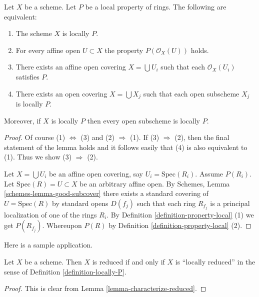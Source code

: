 \begin{lemma}
\label{lemma-locally-P}
Let $X$ be a scheme. Let $P$ be a local property of rings.
The following are equivalent:
\begin{enumerate}
\item The scheme $X$ is locally $P$.
\item For every affine open $U \subset X$ the property
$P(\mathcal{O}_X(U))$ holds.
\item There exists an affine open covering $X = \bigcup U_i$ such that
each $\mathcal{O}_X(U_i)$ satisfies $P$.
\item There exists an open covering $X = \bigcup X_j$
such that each open subscheme $X_j$ is locally $P$.
\end{enumerate}
Moreover, if $X$ is locally $P$ then every open subscheme
is locally $P$.
\end{lemma}

\begin{proof}
Of course (1) $\Leftrightarrow$ (3) and (2) $\Rightarrow$ (1).
If (3) $\Rightarrow$ (2), then the final statement of the lemma
holds and it follows easily that (4) is also equivalent to (1).
Thus we show (3) $\Rightarrow$ (2).

\medskip\noindent
Let $X = \bigcup U_i$ be an affine open covering, say
$U_i = \text{Spec}(R_i)$. Assume $P(R_i)$.
Let $\text{Spec}(R) = U \subset X$ be an arbitrary affine open.
By Schemes, Lemma \ref{schemes-lemma-good-subcover}
there exists a standard covering of $U = \text{Spec}(R)$ by
standard opens $D(f_j)$ such that each ring $R_{f_j}$ is a
principal localization of one of the rings $R_i$. By
Definition \ref{definition-property-local} (1) we get $P(R_{f_j})$.
Whereupon $P(R)$ by Definition \ref{definition-property-local} (2).
\end{proof}

\noindent
Here is a sample application.

\begin{lemma}
\label{lemma-reduced-is-locally-reduced}
Let $X$ be a scheme. Then $X$ is reduced if and only if $X$ is
``locally reduced'' in the sense of Definition \ref{definition-locally-P}.
\end{lemma}

\begin{proof}
This is clear from Lemma \ref{lemma-characterize-reduced}.
\end{proof}

